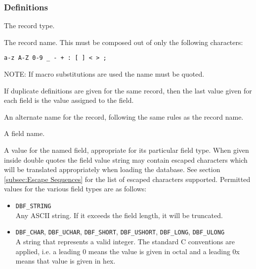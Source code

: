\subsubsection{Definitions}

\begin{description}
\item [record\_type] The record type.

\item [record\_name] The record name.
This must be composed out of only the following characters:

\begin{lstlisting}[language=dbd]
a-z A-Z 0-9 _ - + : [ ] < > ;
\end{lstlisting}

NOTE: If macro substitutions are used the name must be quoted.

If duplicate definitions are given for the same record, then the last value given for each field is the value assigned to the field.

\item [alias\_name] An alternate name for the record, following the same rules as the record name.

\item [field\_name] A field name.

\item [field\_value] A value for the named field, appropriate for its particular field type.
When given inside double quotes the field value string may contain escaped characters which will be translated appropriately when loading the database.
See section \ref{subsec:Escape Sequences} for the list of escaped characters supported.
Permitted values for the various field types are as follows:

\begin{itemize}
\item \verb|DBF_STRING| \\
Any ASCII string. If it exceeds the field length, it will be truncated.

\item \verb|DBF_CHAR|, \verb|DBF_UCHAR|, \verb|DBF_SHORT|, \verb|DBF_USHORT|, \verb|DBF_LONG|, \verb|DBF_ULONG| \\
A string that represents a valid integer.
The standard C conventions are applied, i.e. a leading 0 means the value is given in octal and a leading 0x means that value is given in hex.


\end{itemize}
\end{description}
